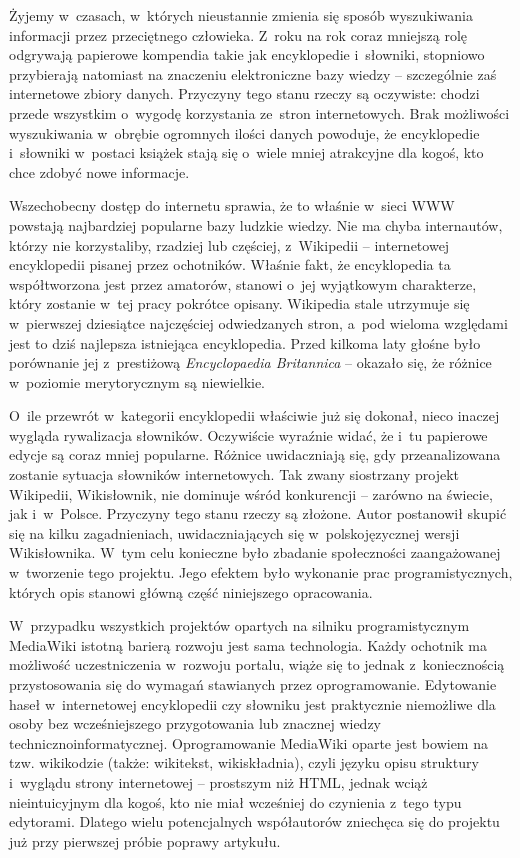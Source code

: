 Żyjemy w~czasach, w~których nieustannie zmienia się sposób wyszukiwania informacji przez przeciętnego człowieka. Z~roku na rok coraz mniejszą rolę odgrywają papierowe kompendia takie jak encyklopedie i~słowniki, stopniowo przybierają natomiast na znaczeniu elektroniczne bazy wiedzy -- szczególnie zaś internetowe zbiory danych. Przyczyny tego stanu rzeczy są oczywiste: chodzi przede wszystkim o~wygodę korzystania ze~stron internetowych. Brak możliwości wyszukiwania w~obrębie ogromnych ilości danych powoduje, że encyklopedie i~słowniki w~postaci książek stają się o~wiele mniej atrakcyjne dla kogoś, kto chce zdobyć nowe informacje.

Wszechobecny dostęp do internetu sprawia, że to właśnie w~sieci WWW powstają najbardziej popularne bazy ludzkie wiedzy. Nie ma chyba internautów, którzy nie korzystaliby, rzadziej lub częściej, z~Wikipedii -- internetowej encyklopedii pisanej przez ochotników. Właśnie fakt, że encyklopedia ta współtworzona jest przez amatorów, stanowi o~jej wyjątkowym charakterze, który zostanie w~tej pracy pokrótce opisany. Wikipedia stale utrzymuje się w~pierwszej dziesiątce najczęściej odwiedzanych stron, a~pod wieloma względami jest to dziś najlepsza istniejąca encyklopedia. Przed kilkoma laty głośne było porównanie jej z~prestiżową \emph{Encyclopaedia Britannica} -- okazało się, że różnice w~poziomie merytorycznym są niewielkie.

O~ile przewrót w~kategorii encyklopedii właściwie już się dokonał, nieco inaczej wygląda rywalizacja słowników. Oczywiście wyraźnie widać, że i~tu papierowe edycje są coraz mniej popularne. Różnice uwidaczniają się, gdy przeanalizowana zostanie sytuacja słowników internetowych. Tak zwany siostrzany projekt Wikipedii, Wikisłownik, nie dominuje wśród konkurencji -- zarówno na świecie, jak i~w~Polsce. Przyczyny tego stanu rzeczy są złożone. Autor postanowił skupić się na kilku zagadnieniach, uwidaczniających się w~polskojęzycznej wersji Wikisłownika. W~tym celu konieczne było zbadanie społeczności zaangażowanej w~tworzenie tego projektu. Jego efektem było wykonanie prac programistycznych, których opis stanowi główną część niniejszego opracowania.

W~przypadku wszystkich projektów opartych na silniku programistycznym MediaWiki istotną barierą rozwoju jest sama technologia. Każdy ochotnik ma możliwość uczestniczenia w~rozwoju portalu, wiąże się to jednak z~koniecznością przystosowania się do wymagań stawianych przez oprogramowanie. Edytowanie haseł w~internetowej encyklopedii czy słowniku jest praktycznie niemożliwe dla osoby bez wcześniejszego przygotowania lub znacznej wiedzy techniczno\dywiz{}informatycznej. Oprogramowanie MediaWiki oparte jest bowiem na tzw. wikikodzie (także: wikitekst, wikiskładnia), czyli języku opisu struktury i~wyglądu strony internetowej -- prostszym niż HTML, jednak wciąż nieintuicyjnym dla kogoś, kto nie miał wcześniej do czynienia z~tego typu edytorami. Dlatego wielu potencjalnych współautorów zniechęca się do projektu już przy pierwszej próbie poprawy artykułu.

